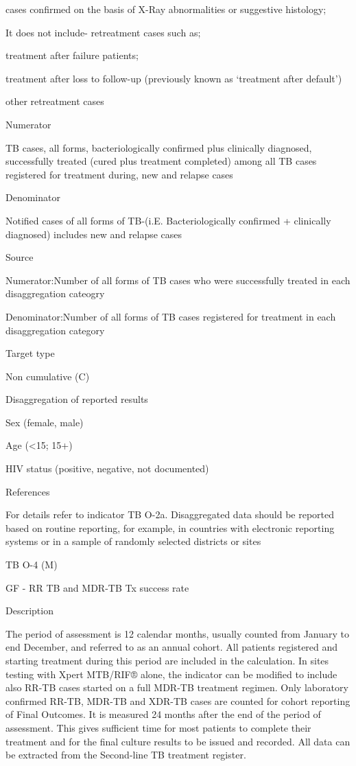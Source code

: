 \documentclass[]{book}
\begin{document}
cases confirmed on the basis of X-Ray abnormalities or suggestive histology;

It does not include- retreatment cases such as;

treatment after failure patients;

treatment after loss to follow-up (previously known as `treatment after default')

other retreatment cases

Numerator

TB cases, all forms, bacteriologically confirmed plus clinically diagnosed, successfully treated (cured plus treatment completed) among all TB cases registered for treatment during, new and relapse cases

Denominator

Notified cases of all forms of TB-(i.E. Bacteriologically confirmed + clinically diagnosed) includes new and relapse cases

Source

Numerator:Number of all forms of TB cases who were successfully treated in each disaggregation cateogry

Denominator:Number of all forms of TB cases registered for treatment in each disaggregation category

Target type

Non cumulative (C)

Disaggregation of reported results

Sex (female, male)

Age (\textless{}15; 15+)

HIV status (positive, negative, not documented)

References

For details refer to indicator TB O-2a. Disaggregated data should be reported based on routine reporting, for example, in countries with electronic reporting systems or in a sample of randomly selected districts or sites

TB O-4 (M)

GF - RR TB and MDR-TB Tx success rate

Description

The period of assessment is 12 calendar months, usually counted from January to end December, and referred to as an annual cohort. All patients registered and starting treatment during this period are included in the calculation. In sites testing with Xpert MTB/RIF® alone, the indicator can be modified to include also RR-TB cases started on a full MDR-TB treatment regimen. Only laboratory confirmed RR-TB, MDR-TB and XDR-TB cases are counted for cohort reporting of Final Outcomes. It is measured 24 months after the end of the period of assessment. This gives sufficient time for most patients to complete their treatment and for the final culture results to be issued and recorded. All data can be extracted from the Second-line TB treatment register.
\end{document}
